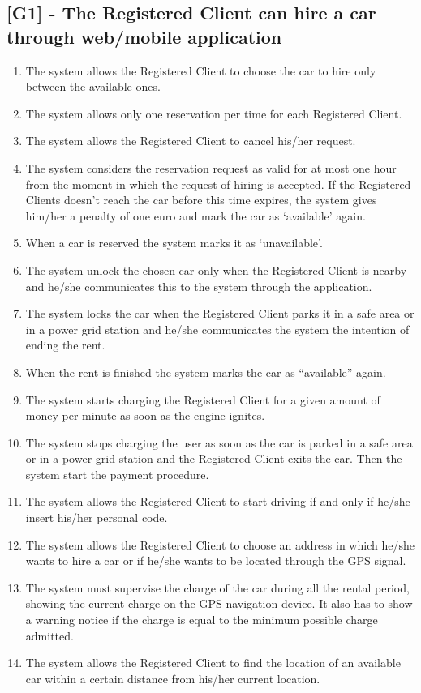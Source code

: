 \subsection{ [G1] - The Registered Client can hire a car through web/mobile application}
\begin{enumerate}[label=R1.\arabic*]
\item The system allows the Registered Client to choose the car to hire only between the available ones.
\item The system allows only one reservation per time for each Registered Client.
\item The system allows the Registered Client to cancel his/her request.
\item The system considers the reservation request as valid for at most one hour from the moment in which the request of hiring is accepted.
If the Registered Clients doesn’t reach the car before this time expires, the system gives him/her a penalty of one euro and mark the car as ‘available’ again.
\item When a car is reserved the system marks it as ‘unavailable’.
\item The system unlock the chosen car only when the Registered Client is nearby and he/she communicates this to the system through the application.
\item The system locks the car when the Registered Client parks it in a safe area or in a power grid station and he/she communicates the system the intention of ending the rent.
\item When the rent is finished the system marks the car as “available” again.
\item The system starts charging the Registered Client for a given amount of money per minute as soon as the engine ignites.
\item The system stops charging the user as soon as the car is parked in a safe area or in a power grid station and the Registered Client exits the car.
Then the system start the payment procedure.
\item The system allows the Registered Client to start driving if and only if he/she insert his/her personal code.
\item The system allows the Registered Client to choose an address in which he/she wants to hire a car or if he/she wants to be located through the GPS signal.
\item The system must supervise the charge of the car during all the rental period, showing the current charge on the GPS navigation device.
It also has to show a warning notice if the charge is equal to the minimum possible charge admitted.
\item The system allows the Registered Client to find the location of an available car within a certain distance from his/her current location.
\end{enumerate}

